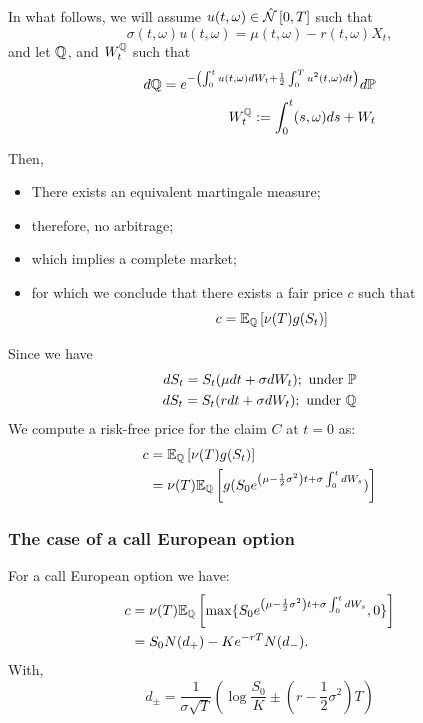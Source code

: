 \documentclass{beamer}
\begin{document}
\begin{frame}
In what follows, we will assume $u(t,\omega) \in \hat{\mathcal{N}}\left[0, T\right]$ such that
\begin{equation}\label{eq:condition_change_measure}
	\sigma(t,\omega) u(t,\omega) = \mu(t,\omega) - r(t,\omega) X_t,
\end{equation}
and let $\mathbb{Q}$, and $W_t^{\mathbb{Q}}$ such that
\begin{align}
  d\mathbb{Q} = e^{-\left(\int_0^t u(t,\omega) dW_t + \frac{1}{2}\int_0^T u^2(t,\omega) dt\right)} d\mathbb{P} \label{eq:emmq} \\
  W^{\mathbb{Q}}_t := \int_0^t (s,\omega) ds + W_t
\end{align}

Then,
\begin{itemize}
	\item There exists an equivalent martingale measure;
	\item therefore, no arbitrage;
	\item which implies a complete market;
	\item for which we conclude that there exists a fair price $c$ such that
	\[
		c = \mathbb{E}_{\mathbb{Q}}\left[\nu(T)g(S_t)\right]
	\]
\end{itemize}
\end{frame}

\begin{frame}
Since we have
\begin{align*}
	dS_t =  S_t(\mu dt + \sigma dW_t); \ \text{under $\mathbb{P}$}\\
	dS_t =  S_t(r dt + \sigma dW_t); \ \text{under $\mathbb{Q}$}
\end{align*}
We compute a risk-free price for the claim $C$ at $t=0$ as:
\begin{align*}
	c &= \mathbb{E}_{\mathbb{Q}}\left[\nu(T)g(S_t)\right]\\
	 &= \nu(T)\mathbb{E}_{\mathbb{Q}}\left[g(S_0e^{\left(\mu - \frac{1}{2}\sigma^2\right) t + \sigma\int_0^t dW_s})\right]
\end{align*}
\end{frame}

\begin{frame}
\frametitle{The case of a call European option}
	For a call European option we have:
	\begin{align}
	c &= \nu(T)\mathbb{E}_{\mathbb{Q}}\left[\max\{S_0e^{\left(\mu - \frac{1}{2}\sigma^2\right) t + \sigma\int_0^t dW_s},0\}\right]\\
		&= S_0N(d_+) - Ke^{-rT}N(d_-).
	\end{align}
	With,
\begin{equation}
d_\pm = \frac{1}{\sigma \sqrt T}\left(\log \frac{S_0}{K} \pm (r - \frac{1}{2}\sigma^2)T\right)  
\end{equation}
\end{frame}
\end{document}

